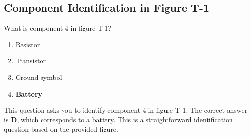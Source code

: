 \subsection{Component Identification in Figure T-1}
\label{T6C05}

\begin{tcolorbox}[colback=gray!10!white,colframe=black!75!black,title=T6C05]
What is component 4 in figure T-1?
\begin{enumerate}[noitemsep]
    \item Resistor
    \item Transistor
    \item Ground symbol
    \item \textbf{Battery}
\end{enumerate}
\end{tcolorbox}

This question asks you to identify component 4 in figure T-1. The correct answer is \textbf{D}, which corresponds to a battery. This is a straightforward identification question based on the provided figure.